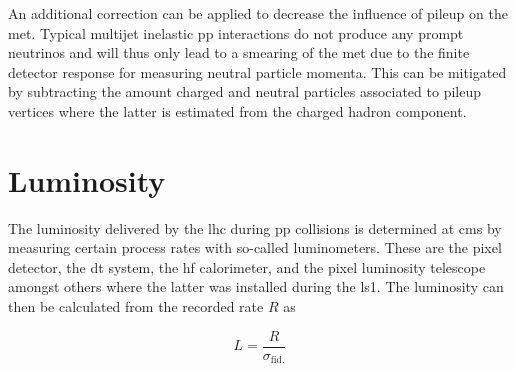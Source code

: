
An additional correction can be applied to decrease the influence of pileup on the \gls{met}. Typical multijet inelastic pp interactions do not produce any prompt neutrinos and will thus only lead to a smearing of the \gls{met} due to the finite detector response for measuring neutral particle momenta. This can be mitigated by subtracting the amount charged and neutral particles associated to pileup vertices where the latter is estimated from the charged hadron component.


\section{Luminosity}

The luminosity delivered by the \gls{lhc} during pp collisions is determined at \gls{cms} by measuring certain process rates with so-called luminometers. These are the pixel detector, the \gls{dt} system, the \gls{hf} calorimeter, and the pixel luminosity telescope~\cite{Kornmayer:2039978} amongst others where the latter was installed during the \gls{ls1}. The luminosity can then be calculated from the recorded rate $R$ as

\begin{equation}
L=\frac{R}{\sigma_\mathrm{fid.}}
\end{equation}

